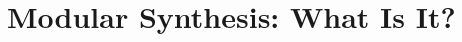 \section[Modular Synthesis: What Is It?]{Modular Synthesis: What Is It?}\label{modular-synth-what-is}

